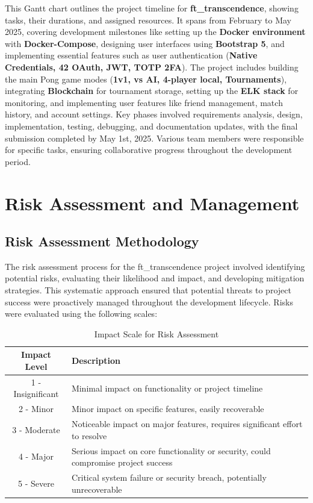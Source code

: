 This Gantt chart outlines the project timeline for \textbf{ft\_transcendence}, showing tasks, their durations, and assigned resources. It spans from February to May 2025, covering development milestones like setting up the \textbf{Docker environment} with \textbf{Docker-Compose}, designing user interfaces using \textbf{Bootstrap 5}, and implementing essential features such as user authentication (\textbf{Native Credentials, 42 OAuth, JWT, TOTP 2FA}). The project includes building the main Pong game modes (\textbf{1v1, vs AI, 4-player local, Tournaments}), integrating \textbf{Blockchain} for tournament storage, setting up the \textbf{ELK stack} for monitoring, and implementing user features like friend management, match history, and account settings. Key phases involved requirements analysis, design, implementation, testing, debugging, and documentation updates, with the final submission completed by May 1st, 2025. Various team members were responsible for specific tasks, ensuring collaborative progress throughout the development period.

\section{Risk Assessment and Management}

\subsection{Risk Assessment Methodology}
The risk assessment process for the ft\_transcendence project involved identifying potential risks, evaluating their likelihood and impact, and developing mitigation strategies. This systematic approach ensured that potential threats to project success were proactively managed throughout the development lifecycle. Risks were evaluated using the following scales:

\begin{table}[H]
    \centering
    \renewcommand{\arraystretch}{1.5}
    \begin{tabular}{|c|p{12cm}|}
    \hline
    \textbf{Impact Level} & \textbf{Description} \\
    \hline
    1 - Insignificant & Minimal impact on functionality or project timeline \\
    \hline
    2 - Minor & Minor impact on specific features, easily recoverable \\
    \hline
    3 - Moderate & Noticeable impact on major features, requires significant effort to resolve \\
    \hline
    4 - Major & Serious impact on core functionality or security, could compromise project success \\
    \hline
    5 - Severe & Critical system failure or security breach, potentially unrecoverable \\
    \hline
    \end{tabular}
    \caption{Impact Scale for Risk Assessment}
    \label{tab:impact_scale}
\end{table}

